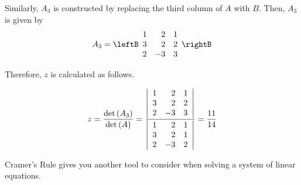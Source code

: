 {\begin{solution}
Similarly, $A_3$ is constructed by replacing the third column of $A$ with $B$. Then, $A_3$ is given by
\begin{equation*}
A_3
=
\leftB
\begin{array}{rrr}
1 & 2 & 1 \\
3 & 2 & 2 \\
2 & -3 & 3
\end{array}
\rightB
\end{equation*}

Therefore, $z$ is calculated as follows. 

\begin{equation*}
z=
\vspace{0.05in}\frac{\det \left(A_{3}\right)}{\det \left(A\right)}
=
\frac{\left|
\begin{array}{rrr}
1 & 2 & 1 \\
3 & 2 & 2 \\
2 & -3 & 3
\end{array}
\right| }{\left|
\begin{array}{rrr}
1 & 2 & 1 \\
3 & 2 & 1 \\
2 & -3 & 2
\end{array}
\right| }=\frac{11}{14}
\end{equation*}
\end{solution}

Cramer's Rule gives you another tool to consider when solving a system of linear equations.

}
